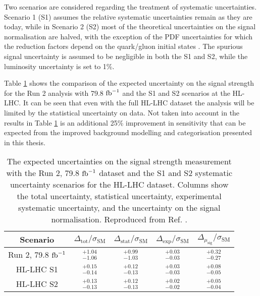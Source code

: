 Two scenarios are considered regarding the treatment of systematic
uncertainties. Scenario 1 (S1) assumes the relative systematic
uncertainties remain as they are today, while in Scenario 2 (S2)
most of the theoretical uncertainties on the signal normalisation
are halved, with the exception of the PDF uncertainties for which the reduction factors depend on the quark/gluon
initial states \cite{Khalek:2018mdn}. The
spurious signal uncertainty is assumed to be negligible in both the S1
and S2, while the luminosity uncertainty is set to 1\%.

Table \ref{tab:out:res} shows the comparison of the expected uncertainty
on the signal strength for the Run 2 analysis with 79.8 $\text{fb}^{-1}$
and the S1 and S2 scenarios at the HL-LHC. It can be seen that 
even with the full HL-LHC dataset the analysis will be limited
by the statistical uncertainty on data. Not taken into account in the results in Table \ref{tab:out:res} is
an additional 25\% improvement in sensitivity that can be expected
from the improved background modelling and categorisation
presented in this thesis.

\begin{table}[htb]
  \renewcommand{\arraystretch}{1.3}
  \centering
  \caption{
    The expected uncertainties on the signal strength measurement with
    the Run 2, 79.8 $\text{fb}^{-1}$ dataset and the S1 and S2 systematic
    uncertainty scenarios for the HL-LHC dataset. Columns show
    the total uncertainty, statistical uncertainty, experimental
    systematic uncertainty, and the uncertainty on the signal
    normalisation.
    Reproduced from Ref. \cite{ATL-PHYS-PUB-2018-054}.}
  \label{tab:out:res}
  \begin{tabular}{ccccc}
    \toprule
    \midrule
    Scenario & $\Delta_\text{tot}/\sigma_\text{SM}$ 
             & $\Delta_\text{stat}/\sigma_\text{SM}$ 
             & $\Delta_\text{exp}/\sigma_\text{SM}$ 
             & $\Delta_{\mu_\text{sig}}/\sigma_\text{SM}$ \\
    \midrule
    Run 2, 79.8 $\text{fb}^{-1}$ & $^{+1.04}_{-1.06}$ & $^{+0.99}_{-1.03}$ & $^{+0.03}_{-0.03}$ & $^{+0.32}_{-0.27}$ \\
    HL-LHC S1          & $^{+0.15}_{-0.14}$ & $^{+0.12}_{-0.13}$ & $^{+0.03}_{-0.03}$ & $^{+0.08}_{-0.05}$ \\
    HL-LHC S2          & $^{+0.13}_{-0.13}$ & $^{+0.12}_{-0.13}$ & $^{+0.02}_{-0.02}$ & $^{+0.05}_{-0.04}$ \\
    \midrule
    \bottomrule
  \end{tabular}
\end{table}

